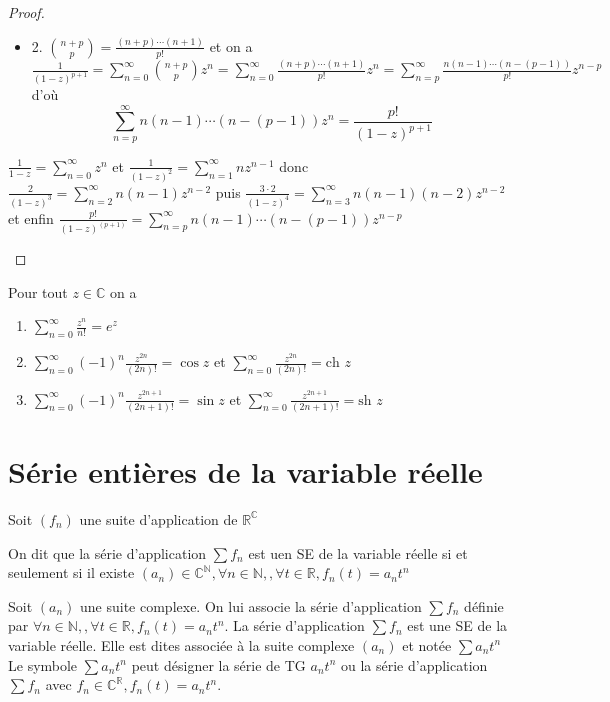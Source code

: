 \documentclass[11pt,hidelinks]{book}
\theoremstyle{mytheoremstyle}
\theoremstyle{mytheoremstyle}
\theoremstyle{mytheoremstyle}
\theoremstyle{mytheoremstyle}
\theoremstyle{mytheoremstyle}
\theoremstyle{mytheoremstyle}
\theoremstyle{mytheoremstyle}
\theoremstyle{mytheoremstyle}
\theoremstyle{myproblemstyle}
\def\mbb#1{\mathbb{#1}}
\def\bN{\mbb{N}}
\def\bC{\mbb{C}}
\def\bR{\mbb{R}}
\def\is#1{\sum_{n=0}^\infty #1}
\def\iss#1#2{\sum_{n=#1}^\infty #2}
\def\ser{\sum a_n t^n}
\def\fn{\forall n \in \bN,}
\begin{document}
\begin{adjustwidth}{-2em}{-1em}
\begin{prop}
\begin{proof}
\begin{itemize}[label=$\cdot$]
            \item 2. $\binom{n+p}{p} = \frac{(n+p)\cdots (n+1)}{p!}$ et 
            on a $\frac{1}{(1-z)^{p+1}} = \is{\binom{n+p}{p}z^n} = \is{\frac{(n+p)\cdots (n+1)}{p!}z^n} = \iss{p}{\frac{n(n-1)\cdots (n-(p-1))}{p!}z^{n-p}}$
            d'où 
            \begin{equation*}
            \iss{p}{n(n-1)\cdots (n-(p-1))z^n} = \frac{p!}{(1-z)^{p+1}}
            \end{equation*}
        \end{itemize}
            \begin{rmq}
                $\frac{1}{1-z} = \is{z^n}$ et $\frac{1}{(1-z)^2} = \iss{1}{nz^{n-1}}$
                donc $\frac{2}{(1-z)^3} = \iss{2}{n(n-1)z^{n-2}}$ puis $\frac{3 \cdot 2}{(1-z)^4} = \iss{3}{n(n-1)(n-2)z^{n-2}}
                $ et enfin $\frac{p!}{(1-z)^(p+1)} = \iss{p}{n(n-1)\cdots (n-(p-1))z^{n-p}}$
            \end{rmq}
        \end{proof}
    \end{prop}
    \begin{prop}
        Pour tout $z \in \bC$ on a 
        \begin{enumerate}
            \item $\is{\frac{z^n}{n!}} = e^z$ 
            \item $\is{(-1)^n \frac{z^{2n}}{(2n)!}} = \cos z$ et $\is{\frac{z^{2n}}{(2n)!}} = \text{ch } z$
            \item $\is{(-1)^n \frac{z^{2n+1}}{(2n+1)!}} = \sin z$ et $\is{\frac{z^{2n+1}}{(2n+1)!}} = \text{sh } z$
        \end{enumerate}
    \end{prop}
\end{adjustwidth}
\section{Série entières de la variable réelle}
\begin{definition}
    Soit $(f_n)$ une suite d'application de $\bR^{\bC}$
    
    
    On dit que la série d'application $\sum f_n$ est uen SE de 
    la variable réelle si et seulement si il existe $(a_n) \in \bC^{\bN}, 
    \fn, \forall t \in \bR, f_n(t) = a_n t^n$ 
\end{definition}
\begin{rmq}
    Soit $(a_n)$ une suite complexe. On lui associe la série d'application 
    $\sum f_n$ définie par $\fn, \forall t \in \bR, f_n(t) = a_n t^n$. 
    La série d'application $\sum f_n$ est une SE de la variable réelle.
    Elle est dites associée à la suite complexe $(a_n)$ et notée $\ser$ 
    Le symbole $\ser$ peut désigner la série de TG $a_n t^n$ ou la série d'application 
    $\sum f_n$ avec $f_n \in \bC^{\bR}, f_n(t) = a_n t^n$.
\end{rmq}
\end{document}

